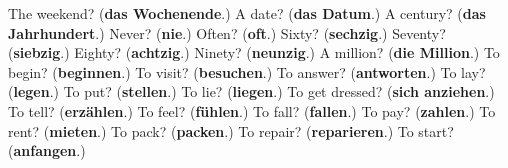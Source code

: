 \begin{tcolorbox}[breakable,colback=teal!4,colframe=teal!35!black,title={Before you move on}]
The weekend? (\textbf{das Wochenende}.) A date? (\textbf{das Datum}.) A century? (\textbf{das Jahrhundert}.) Never? (\textbf{nie}.) Often? (\textbf{oft}.) Sixty? (\textbf{sechzig}.) Seventy? (\textbf{siebzig}.) Eighty? (\textbf{achtzig}.) Ninety? (\textbf{neunzig}.) A million? (\textbf{die Million}.) To begin? (\textbf{beginnen}.) To visit? (\textbf{besuchen}.) To answer? (\textbf{antworten}.) To lay? (\textbf{legen}.) To put? (\textbf{stellen}.) To lie? (\textbf{liegen}.) To get dressed? (\textbf{sich anziehen}.) To tell? (\textbf{erzählen}.) To feel? (\textbf{fühlen}.) To fall? (\textbf{fallen}.) To pay? (\textbf{zahlen}.) To rent? (\textbf{mieten}.) To pack? (\textbf{packen}.) To repair? (\textbf{reparieren}.) To start? (\textbf{anfangen}.)
\end{tcolorbox}
